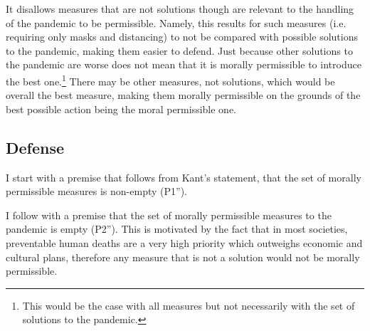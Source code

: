 It disallows measures that are not solutions though are relevant to the handling of the pandemic to be permissible.
Namely, this results for such measures (i.e. requiring only masks and distancing) to not be compared with possible solutions to the pandemic, making them easier to defend.
Just because other solutions to the pandemic are worse does not mean that it is morally permissible to introduce the best one.\footnote{This would be the case with all measures but not necessarily with the set of solutions to the pandemic.}
There may be other measures, not solutions, which would be overall the best measure, making them morally permissible on the grounds of the best possible action being the moral permissible one.

\begin{argument}
\end{argument}

\subsection{Defense}

I start with a premise that follows from Kant's statement, that the set of morally permissible measures is non-empty (P1'').

I follow with a premise that the set of morally permissible measures to the pandemic is empty (P2'').
This is motivated by the fact that in most societies, preventable human deaths are a very high priority which outweighs economic and cultural plans, therefore any measure that is not a solution would not be morally permissible.

